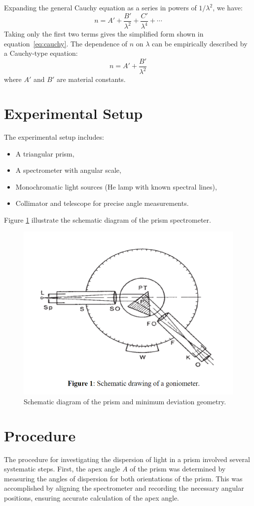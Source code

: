 \documentclass[journal]{IEEEtran}
\begin{document}
Expanding the general Cauchy equation as a series in powers of \( 1/\lambda^2 \), we have:
\begin{equation}
n = A' + \frac{B'}{\lambda^2} + \frac{C'}{\lambda^4} + \cdots
\end{equation}
Taking only the first two terms gives the simplified form shown in equation~\eqref{eq:cauchy}.
The dependence of \( n \) on \( \lambda \) can be empirically described by a Cauchy-type equation:
\begin{equation}
n = A' + \frac{B'}{\lambda^2}
\label{eq:cauchy}
\end{equation}
where \( A' \) and \( B' \) are material constants.

\section{Experimental Setup}
The experimental setup includes:
\begin{itemize}
    \item A triangular prism,
    \item A spectrometer with angular scale,
    \item Monochromatic light sources (He lamp with known spectral lines),
    \item Collimator and telescope for precise angle measurements.
\end{itemize}

Figure  \ref{fig:diagram} illustrate the schematic diagram of the prism spectrometer.
\begin{figure}[H]
    \centering
    \includegraphics[width=0.6\linewidth]{../IMAGES/prism_diagram.png}
    \caption{Schematic diagram of the prism and minimum deviation geometry.}
    \label{fig:diagram}
\end{figure}

\section*{Procedure}
The procedure for investigating the dispersion of light in a prism involved several systematic steps. First, the apex angle \( A \) of the prism was determined by measuring the angles of dispersion for both orientations of the prism. This was accomplished by aligning the spectrometer and recording the necessary angular positions, ensuring accurate calculation of the apex angle.
\end{document}
